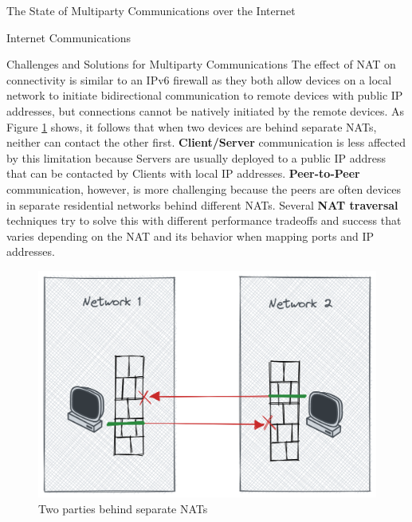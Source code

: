 \begin{frame}[fragile]{The State of Multiparty Communications over the
Internet}
\begin{block}{Internet Communications}
\begin{block}{Challenges and Solutions for Multiparty Communications}
The effect of NAT on connectivity is similar to an IPv6 firewall as they
both allow devices on a local network to initiate bidirectional
communication to remote devices with public IP addresses, but
connections cannot be natively initiated by the remote devices. As
Figure \ref{nat-intro} shows, it follows that when two devices are
behind separate NATs, neither can contact the other first.
\textbf{Client/Server} communication is less affected by this limitation
because Servers are usually deployed to a public IP address that can be
contacted by Clients with local IP addresses. \textbf{Peer-to-Peer}
communication, however, is more challenging because the peers are often
devices in separate residential networks behind different NATs. Several
\textbf{NAT traversal} techniques try to solve this with different
performance tradeoffs and success that varies depending on the NAT
\autocite{natBehaviorRFC} and its behavior when mapping ports and IP
addresses.

\begin{figure}
\centering
\includegraphics[width=\textwidth,height=0.25\textheight]{thesis/../figures/nat-intro.png}
\caption{Two parties behind separate NATs\label{nat-intro}}
\end{figure}


\end{block}
\end{block}
\end{frame}
